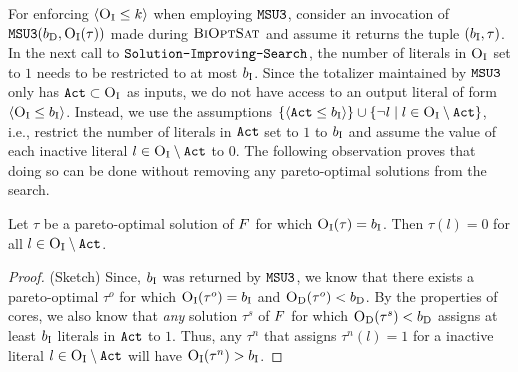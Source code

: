 For enforcing $\langle \textsc{O}_{\text{I}} \leq k \rangle$ when employing $\texttt{MSU3}$, consider an invocation of $\texttt{MSU3}(b_{\text{D}} , \textsc{O}_{\text{I}}(\tau))$ made during $\textsc{BiOptSat}$ and assume it returns the tuple $(b_{\text{I}}, \tau)$. 
In the next call to $\texttt{Solution-\allowbreak{}Improving-\allowbreak{}Search}$, the number of literals in $\textsc{O}_{\text{I}}$ set to $1$ needs to be restricted to at most $b_{\text{I}}$. 
Since the totalizer maintained by $\texttt{MSU3}$ only has $\texttt{Act} \subset \textsc{O}_{\text{I}}$ as inputs, we do not have access to an output literal of form  $\langle \textsc{O}_{\text{I}} \leq b_{\text{I}} \rangle$.
Instead, we use  the assumptions $\{\langle \texttt{Act} \leq b_{\text{I}} \rangle\} \cup \{ \lnot l \mid l \in \textsc{O}_{\text{I}} \setminus \texttt{Act} \}$, i.e., restrict the number of literals in $\texttt{Act}$ set to $1$ to $b_{\text{I}}$ and assume the value of each inactive literal $l \in \textsc{O}_{\text{I}} \setminus \texttt{Act}$ to $0$. 
The following observation proves that doing so can be done without removing any pareto-optimal solutions from the search. 
\begin{observation}\label{obs:sound}
  Let $\tau$ be a pareto-optimal solution of $F$ for which $\textsc{O}_{\text{I}}(\tau) = b_{\text{I}}$.
  Then $\tau(l) = 0$ for all $l \in \textsc{O}_{\text{I}} \setminus \texttt{Act}$. 
\end{observation}
\begin{proof}(Sketch)
  Since, $b_{\text{I}}$ was returned by $\texttt{MSU3}$, we know that there exists a pareto-optimal $\tau^o$ for which $\textsc{O}_{\text{I}}(\tau^o) = b_{\text{I}}$ and $\textsc{O}_{\text{D}}(\tau^o) < b_{\text{D}}$.
  By the properties of cores, we also know that \emph{any} solution $\tau^s$ of $F$ for which $\textsc{O}_{\text{D}}(\tau^s) < b_{\text{D}}$ assigns at least $b_{\text{I}}$ literals in $\texttt{Act}$ to $1$.
  Thus, any $\tau^n$ that assigns $\tau^n(l) = 1$ for a inactive literal $l \in  \textsc{O}_{\text{I}} \setminus \texttt{Act}$ will have $\textsc{O}_{\text{I}}(\tau^n) > b_{\text{I}}$.
\end{proof}


